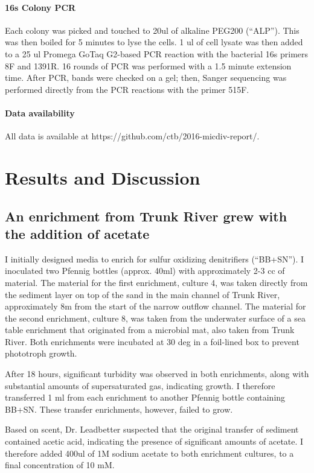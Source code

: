 \documentclass{article}
\begin{document}
\paragraph{16s Colony PCR} Each colony was picked and touched to 20ul of
alkaline PEG200 (``ALP'').  This was then boiled for 5 minutes to lyse
the cells. 1 ul of cell lysate was then added to a 25 ul Promega GoTaq
G2-based PCR reaction with the bacterial 16s primers 8F and 1391R.  16
rounds of PCR was performed with a 1.5 minute extension time.  After
PCR, bands were checked on a gel; then,
Sanger sequencing was performed directly from the PCR reactions with
the primer 515F.

\paragraph{Data availability}

All data is available at https://github.com/ctb/2016-micdiv-report/.

\section*{Results and Discussion}

\subsection*{An enrichment from Trunk River grew with the addition of acetate}

I initially designed media to enrich for sulfur oxidizing denitrifiers
(``BB+SN'').  I inoculated two Pfennig bottles (approx. 40ml)
with approximately 2-3 cc of material.  The material for the first
enrichment, culture 4, was taken directly from the sediment layer on
top of the sand in the main channel of Trunk River, approximately 8m
from the start of the narrow outflow channel. The material for the
second enrichment, culture 8, was taken from the underwater surface of
a sea table enrichment that originated from a microbial mat, also
taken from Trunk River.  Both enrichments were incubated at 30 deg
in a foil-lined box to prevent phototroph growth.

After 18 hours, significant turbidity was observed in both
enrichments, along with substantial amounts of supersaturated gas,
indicating growth.  I therefore transferred 1 ml from each enrichment
to another Pfennig bottle containing BB+SN.  These transfer
enrichments, however, failed to grow.

Based on scent, Dr. Leadbetter suspected that the original transfer of
sediment contained acetic acid, indicating the presence of significant
amounts of acetate.  I therefore added 400ul of 1M sodium acetate to
both enrichment cultures, to a final concentration of 10 mM.
\end{document}
